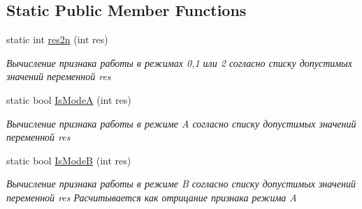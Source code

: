 \subsection*{Static Public Member Functions}
\begin{DoxyCompactItemize}
\item 
static int \hyperlink{class_c_v_i_engine_thread_a45d685448f47622c68e8f78593f7b69d}{res2n} (int res)
\begin{DoxyCompactList}\small\item\em Вычисление признака работы в режимах 0,1 или 2 согласно списку допустимых значений переменной res \end{DoxyCompactList}\item 
static bool \hyperlink{class_c_v_i_engine_thread_a85ffa17426e02ff2d5b03c5f37a1b0f8}{Is\+Mode\+A} (int res)
\begin{DoxyCompactList}\small\item\em Вычисление признака работы в режиме A согласно списку допустимых значений переменной res \end{DoxyCompactList}\item 
static bool \hyperlink{class_c_v_i_engine_thread_a4bbe730e3cd1bdadb1da99cce23fa8db}{Is\+Mode\+B} (int res)
\begin{DoxyCompactList}\small\item\em Вычисление признака работы в режиме B согласно списку допустимых значений переменной res Расчитывается как отрицание признака режима A \end{DoxyCompactList}\end{DoxyCompactItemize}
